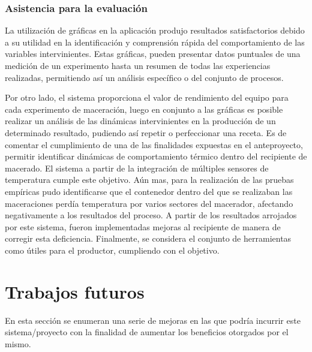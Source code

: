 \subsubsection{Asistencia para la evaluación}  
\par La utilización de gráficas en la aplicación produjo resultados satisfactorios debido a su utilidad en la identificación y comprensión rápida del comportamiento de las variables intervinientes. Estas gráficas, pueden presentar datos puntuales de una medición de un experimento hasta un resumen de todas las experiencias realizadas, permitiendo así un análisis específico o del conjunto de procesos.
\par Por otro lado, el sistema proporciona el valor de rendimiento del equipo para cada experimento de maceración, luego en conjunto a las gráficas es posible realizar un análisis de las dinámicas intervinientes en la producción de un determinado resultado, pudiendo así repetir o perfeccionar una receta.
Es de comentar el cumplimiento de una de las finalidades expuestas en el anteproyecto, permitir identificar dinámicas de comportamiento térmico dentro del recipiente de macerado. El sistema a partir de la integración de múltiples sensores de temperatura cumple este objetivo. Aún mas, para la realización de las pruebas empíricas pudo identificarse que el contenedor dentro del que se realizaban las maceraciones perdía temperatura por varios sectores del macerador, afectando negativamente a los resultados del proceso. A partir de los resultados arrojados por este sistema, fueron implementadas mejoras al recipiente de manera de corregir esta deficiencia.
Finalmente, se considera el conjunto de herramientas como útiles para el productor, cumpliendo con el objetivo. 

\section{Trabajos futuros} %
\par En esta sección se enumeran una serie de mejoras en las que podría incurrir este sistema/proyecto con la finalidad de aumentar los beneficios otorgados por el mismo.

